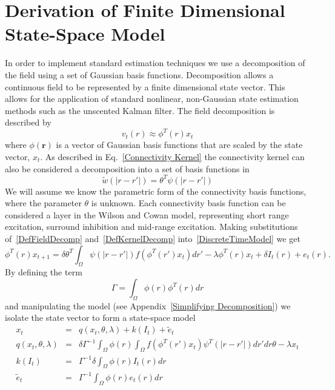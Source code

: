 \documentclass[onecolumn,draftcls]{IEEEtran}
\begin{document}
\section{Derivation of Finite Dimensional State-Space Model}
In order to implement standard estimation techniques we use a decomposition of the field using a set of Gaussian basis functions. Decomposition allows a continuous field to be represented by a finite dimensional state vector. This allows for the application of standard nonlinear, non-Gaussian state estimation methods such as the unscented Kalman filter. The field decomposition is described by
\begin{equation}\label{DefFieldDecomp}
	v_t\left(r\right) \approx \phi ^T\left(r\right) x_t
\end{equation}
where $\phi(\mathbf{r})$ is a vector of Gaussian basis functions that are scaled by the state vector, $x_t$. As described in Eq.~\ref{Connectivity Kernel} the connectivity kernel can also be considered a decomposition into a set of basis functions in 
\begin{equation}\label{DefKernelDecomp}
	\tilde{w}( |r-r'| ) = \theta^T\psi\left(|r-r'|\right)
\end{equation}
We will assume we know the parametric form of the connectivity basis functions, where the parameter $\theta$ is unknown. Each connectivity basis function can be considered a layer in the Wilson and Cowan model, representing short range excitation, surround inhibition and mid-range excitation. Making substitutions of~\ref{DefFieldDecomp} and~\ref{DefKernelDecomp} into~\ref{DiscreteTimeModel} we get
\begin{equation}\label{reduced continuous model}
	\phi^T\left( r \right)x_{t+1} = \delta\theta^T\int_\Omega  {\psi \left(|r-r'|\right)f\left( \phi ^T\left(r'\right)x_t \right)dr'}  - \lambda\phi^T\left(r\right)x_t + \delta I_t\left(r\right) + e_t\left(r\right).
\end{equation}
By defining the term
\begin{equation}\label{DefGamma}
	\Gamma  = \int_\Omega  {\phi \left(r\right)\phi ^T\left(r\right)dr}
\end{equation}
and manipulating the model (see Appendix~\ref{Simplifying Decomposition}) we isolate the state vector to form a state-space model
\begin{eqnarray}\label{Homogeneous SS Model}
	x_t &=& q(x_t,\theta,\lambda) + k(I_t) + \tilde{e}_t \\
	q(x_t,\theta,\lambda) &=& \delta\Gamma^{ - 1}\int_\Omega {\phi\left(r\right) \int_\Omega {f\left(\phi^T\left(r'\right)x_t\right)\psi^T \left(|r-r'|\right)dr'} dr} \theta - \lambda x_t \\
	k(I_t) &=& \Gamma^{-1}\delta \int_\Omega{\phi \left(r\right) I_t\left(r\right)dr} \\
	\tilde{e}_t &=& \Gamma^{-1}\int_\Omega{\phi\left(r\right)e_t\left(r\right)dr} \\
\end{eqnarray}
\end{document}
